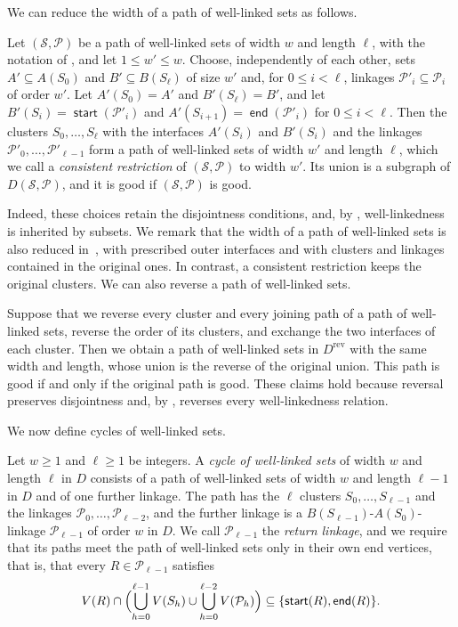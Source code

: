 \documentclass[fontsize=12pt,leading=14pt]{fullpaper}
\DeclareMathOperator{\st}{\mathsf{start}}
\DeclareMathOperator{\en}{\mathsf{end}}
\newcommand{\rev}{\mathrm{rev}}
\newcommand{\Pcal}{\mathcal{P}}
\newcommand{\Scal}{\mathcal{S}}
\begin{document}
We can reduce the width of a path of well-linked sets as follows.

\begin{remark}\label{rem:restrict}
  Let $(\Scal,\Pcal)$ be a path of well-linked sets of width $w$ and length $\ell$, with the notation of , and let $1\le w'\le w$.
  Choose, independently of each other, sets $A'\subseteq A(S_0)$ and $B'\subseteq B(S_\ell)$ of size $w'$ and, for $0\le i<\ell$, linkages $\Pcal'_i\subseteq\Pcal_i$ of order $w'$.
  Let $A'(S_0)=A'$ and $B'(S_\ell)=B'$, and let $B'(S_i)=\st(\Pcal'_i)$ and $A'(S_{i+1})=\en(\Pcal'_i)$ for $0\le i<\ell$.
  Then the clusters $S_0,\dots,S_\ell$ with the interfaces $A'(S_i)$ and $B'(S_i)$ and the linkages $\Pcal'_0,\dots,\Pcal'_{\ell-1}$ form a path of well-linked sets of width $w'$ and length $\ell$, which we call a \emph{consistent restriction} of $(\Scal,\Pcal)$ to width $w'$.
  Its union is a subgraph of $D(\Scal,\Pcal)$, and it is good if $(\Scal,\Pcal)$ is good.
\end{remark}

Indeed, these choices retain the disjointness conditions, and, by , well-linkedness is inherited by subsets.
We remark that the width of a path of well-linked sets is also reduced in~\cite[Observation~8.9]{HKMM26a}, with prescribed outer interfaces and with clusters and linkages contained in the original ones.
In contrast, a consistent restriction keeps the original clusters.
We can also reverse a path of well-linked sets.

\begin{remark}\label{lem:reverse}
  Suppose that we reverse every cluster and every joining path of a path of well-linked sets, reverse the order of its clusters, and exchange the two interfaces of each cluster.
  Then we obtain a path of well-linked sets in $D^\rev$ with the same width and length, whose union is the reverse of the original union.
  This path is good if and only if the original path is good.
  These claims hold because reversal preserves disjointness and, by , reverses every well-linkedness relation.
\end{remark}

We now define cycles of well-linked sets.

\begin{definition}\label{def:wl-cycle}
  Let $w\ge1$ and $\ell\ge1$ be integers.
  A \emph{cycle of well-linked sets} of width $w$ and length $\ell$ in $D$ consists of a path of well-linked sets of width $w$ and length $\ell-1$ in $D$ and of one further linkage.
  The path has the $\ell$ clusters $S_0,\dots,S_{\ell-1}$ and the linkages $\Pcal_0,\dots,\Pcal_{\ell-2}$, and the further linkage is a $B(S_{\ell-1})$-$A(S_0)$-linkage $\Pcal_{\ell-1}$ of order $w$ in $D$.
  We call $\Pcal_{\ell-1}$ the \emph{return linkage}, and we require that its paths meet the path of well-linked sets only in their own end vertices, that is, that every $R\in\Pcal_{\ell-1}$ satisfies
  \[
    V(R)\cap\Bigl(\bigcup_{h=0}^{\ell-1}V(S_h)\cup\bigcup_{h=0}^{\ell-2}V(\Pcal_h)\Bigr)\subseteq\{\st(R),\en(R)\}.
  \]
\end{definition}
\end{document}
